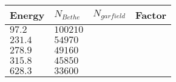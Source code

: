 \begin{table}[ht]
  \centering
  \caption[]
  {}
  \label{chap3:GarfieldBethe}
  \begin{tabular}{llll}
    \toprule
    Energy    & \(N_{Bethe}\) & \(N_{garfield}\) & Factor \\
    \midrule
    \(97.2\)  & \(100210\)    & \(\)             & \(\)   \\
    \(231.4\) & \(54970\)     & \(\)             & \(\)   \\
    \(278.9\) & \(49160\)     & \(\)             & \(\)   \\
    \(315.8\) & \(45850\)     & \(\)             & \(\)   \\
    \(628.3\) & \(33600\)     & \(\)             & \(\)   \\
    \bottomrule
  \end{tabular}
\end{table}